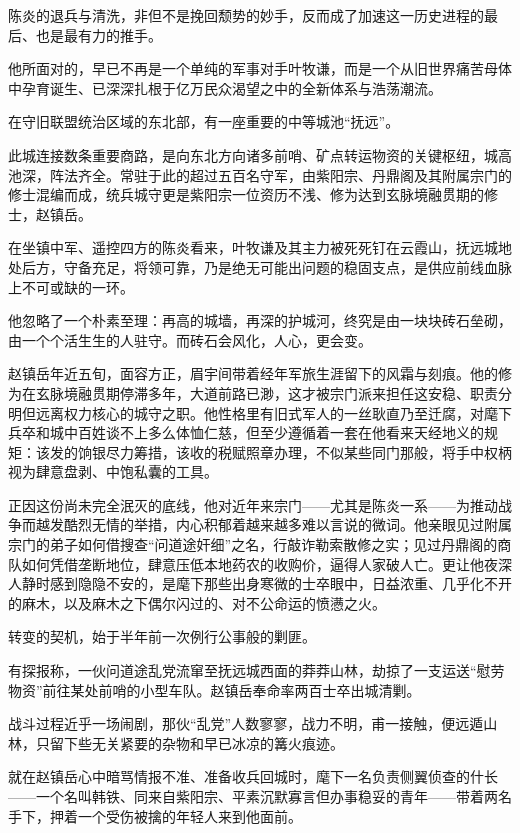 陈炎的退兵与清洗，非但不是挽回颓势的妙手，反而成了加速这一历史进程的最后、也是最有力的推手。

他所面对的，早已不再是一个单纯的军事对手叶牧谦，而是一个从旧世界痛苦母体中孕育诞生、已深深扎根于亿万民众渴望之中的全新体系与浩荡潮流。

\vspace{2em}

在守旧联盟统治区域的东北部，有一座重要的中等城池“抚远”。

此城连接数条重要商路，是向东北方向诸多前哨、矿点转运物资的关键枢纽，城高池深，阵法齐全。常驻于此的超过五百名守军，由紫阳宗、丹鼎阁及其附属宗门的修士混编而成，统兵城守更是紫阳宗一位资历不浅、修为达到玄脉境融贯期的修士，赵镇岳。

在坐镇中军、遥控四方的陈炎看来，叶牧谦及其主力被死死钉在云霞山，抚远城地处后方，守备充足，将领可靠，乃是绝无可能出问题的稳固支点，是供应前线血脉上不可或缺的一环。

他忽略了一个朴素至理：再高的城墙，再深的护城河，终究是由一块块砖石垒砌，由一个个活生生的人驻守。而砖石会风化，人心，更会变。

赵镇岳年近五旬，面容方正，眉宇间带着经年军旅生涯留下的风霜与刻痕。他的修为在玄脉境融贯期停滞多年，大道前路已渺，这才被宗门派来担任这安稳、职责分明但远离权力核心的城守之职。他性格里有旧式军人的一丝耿直乃至迁腐，对麾下兵卒和城中百姓谈不上多么体恤仁慈，但至少遵循着一套在他看来天经地义的规矩：该发的饷银尽力筹措，该收的税赋照章办理，不似某些同门那般，将手中权柄视为肆意盘剥、中饱私囊的工具。

正因这份尚未完全泯灭的底线，他对近年来宗门——尤其是陈炎一系——为推动战争而越发酷烈无情的举措，内心积郁着越来越多难以言说的微词。他亲眼见过附属宗门的弟子如何借搜查“问道途奸细”之名，行敲诈勒索散修之实；见过丹鼎阁的商队如何凭借垄断地位，肆意压低本地药农的收购价，逼得人家破人亡。更让他夜深人静时感到隐隐不安的，是麾下那些出身寒微的士卒眼中，日益浓重、几乎化不开的麻木，以及麻木之下偶尔闪过的、对不公命运的愤懑之火。

转变的契机，始于半年前一次例行公事般的剿匪。

有探报称，一伙问道途乱党流窜至抚远城西面的莽莽山林，劫掠了一支运送“慰劳物资”前往某处前哨的小型车队。赵镇岳奉命率两百士卒出城清剿。

战斗过程近乎一场闹剧，那伙“乱党”人数寥寥，战力不明，甫一接触，便远遁山林，只留下些无关紧要的杂物和早已冰凉的篝火痕迹。

就在赵镇岳心中暗骂情报不准、准备收兵回城时，麾下一名负责侧翼侦查的什长——一个名叫韩铁、同来自紫阳宗、平素沉默寡言但办事稳妥的青年——带着两名手下，押着一个受伤被擒的年轻人来到他面前。

